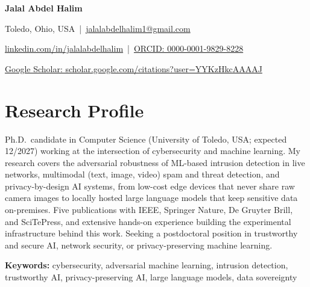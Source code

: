 \documentclass[11pt,a4paper]{article}
\begin{document}
\begin{center}
  {\LARGE\bfseries Jalal Abdel Halim}\par\vspace{4pt}
  Toledo, Ohio, USA \,|\,
  \href{mailto:jalalabdelhalim1@gmail.com}{jalalabdelhalim1@gmail.com}\par
  \href{https://www.linkedin.com/in/jalalabdelhalim}{linkedin.com/in/jalalabdelhalim} \,|\,
  \href{https://orcid.org/0000-0001-9829-8228}{ORCID: 0000-0001-9829-8228}\par
  \href{https://scholar.google.com/citations?user=YYKzHkcAAAAJ}{Google Scholar: scholar.google.com/citations?user=YYKzHkcAAAAJ}
\end{center}

\section{Research Profile}
Ph.D.\ candidate in Computer Science (University of Toledo, USA; expected 12/2027)
working at the intersection of cybersecurity and machine learning. My research
covers the adversarial robustness of ML-based intrusion detection in live networks,
multimodal (text, image, video) spam and threat detection, and privacy-by-design
AI systems, from low-cost edge devices that never share raw camera images to
locally hosted large language models that keep sensitive data on-premises. Five
publications with IEEE, Springer Nature, De Gruyter Brill, and SciTePress, and
extensive hands-on experience building the experimental infrastructure behind
this work. Seeking a postdoctoral position in trustworthy and secure AI, network
security, or privacy-preserving machine learning.\par\vspace{3pt}
\textbf{Keywords:} cybersecurity, adversarial machine learning, intrusion detection,
trustworthy AI, privacy-preserving AI, large language models, data sovereignty

\end{document}

